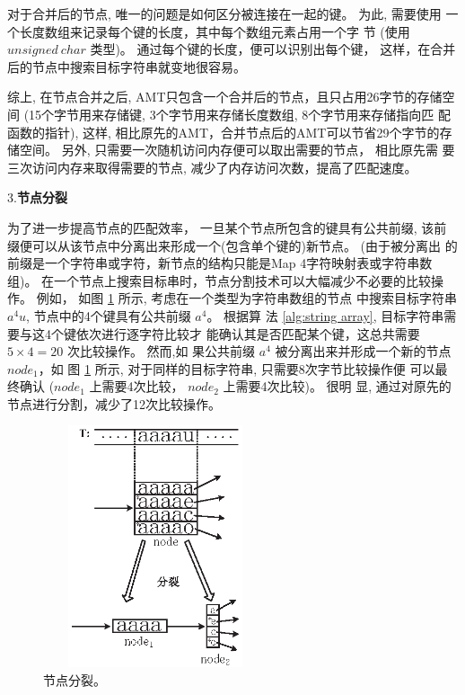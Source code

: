对于合并后的节点, 唯一的问题是如何区分被连接在一起的键。 为此, 需要使用
一个长度数组来记录每个键的长度，其中每个数组元素占用一个字
节 (使用$unsigned~char$ 类型)。 通过每个键的长度，便可以识别出每个键，
这样，在合并后的节点中搜索目标字符串就变地很容易。

综上, 在节点合并之后, AMT只包含一个合并后的节点，且只占用26字节的存储空
间 (15个字节用来存储键, 3个字节用来存储长度数组, 8个字节用来存储指向匹
配函数的指针), 这样, 相比原先的AMT，合并节点后的AMT可以节省29个字节的存
储空间。 另外, 只需要一次随机访问内存便可以取出需要的节点， 相比原先需
要三次访问内存来取得需要的节点, 减少了内存访问次数，提高了匹配速度。

\vspace{0.4cm} 3.\textbf{节点分裂}

为了进一步提高节点的匹配效率， 一旦某个节点所包含的键具有公共前缀, 该前
缀便可以从该节点中分离出来形成一个(包含单个键的)新节点。 (由于被分离出
的前缀是一个字符串或字符，新节点的结构只能是Map 4字符映射表或字符串数
组)。 在一个节点上搜索目标串时，节点分割技术可以大幅减少不必要的比较操
作。 例如， 如图 \ref{fig:split} 所示, 考虑在一个类型为字符串数组的节点
中搜索目标字符串 $a^4u$, 节点中的4个键具有公共前缀 $a^4$。 根据算
法 \ref{alg:string array}, 目标字符串需要与这4个键依次进行逐字符比较才
能确认其是否匹配某个键，这总共需要 $5 \times 4 = 20$ 次比较操作。 然而,如
果公共前缀 $a^4$ 被分离出来并形成一个新的节点$node_1$，如
图 \ref{fig:split} 所示, 对于同样的目标字符串, 只需要8次字节比较操作便
可以最终确认 ($node_1$ 上需要4次比较， $node_2$ 上需要4次比较)。 很明
显, 通过对原先的节点进行分割，减少了12次比较操作。

\begin{figure}[H]
  \centering
  \includegraphics[height=2.8in, width=2.6in]{figures/2_MPM/node_split}
  \caption{节点分裂。}
  \label{fig:split}
\end{figure}

